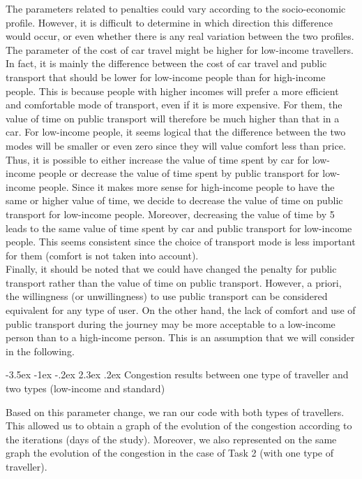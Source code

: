 \documentclass[a4paper, 12pt,oneside]{article}
\makeatletter
\renewcommand{\subsection}{\@startsection {subsection}{1}{\z@}%
             {-3.5ex \@plus -1ex \@minus -.2ex}%
             {2.3ex \@plus.2ex}%
             {\normalfont\normalsize\bfseries}}
\makeatother
\begin{document}
The parameters related to penalties could vary according to the socio-economic profile. However, it is difficult to determine in which direction this difference would occur, or even whether there is any real variation between the two profiles.\\

The parameter of the cost of car travel might be higher for low-income travellers. In fact, it is mainly the difference between the cost of car travel and public transport that should be lower for low-income people than for high-income people. This is because people with higher incomes will prefer a more efficient and comfortable mode of transport, even if it is more expensive. For them, the value of time on public transport will therefore be much higher than that in a car. For low-income people, it seems logical that the difference between the two modes will be smaller or even zero since they will value comfort less than price.\\

Thus, it is possible to either increase the value of time spent by car for low-income people or decrease the value of time spent by public transport for low-income people. Since it makes more sense for high-income people to have the same or higher value of time, we decide to decrease the value of time on public transport for low-income people. Moreover, decreasing the value of time by 5 leads to the same value of time spent by car and public transport for low-income people. This seems consistent since the choice of transport mode is less important for them (comfort is not taken into account).\\

Finally, it should be noted that we could have changed the penalty for public transport rather than the value of time on public transport. However, a priori, the willingness (or unwillingness) to use public transport can be considered equivalent for any type of user. On the other hand, the lack of comfort and use of public transport during the journey may be more acceptable to a low-income person than to a high-income person. This is an assumption that we will consider in the following.

\subsection{Congestion results between one type of traveller and two types (low-income and standard)}

Based on this parameter change, we ran our code with both types of travellers. This allowed us to obtain a graph of the evolution of the congestion according to the iterations (days of the study). Moreover, we also represented on the same graph the evolution of the congestion in the case of Task 2 (with one type of traveller). 
\end{document}
